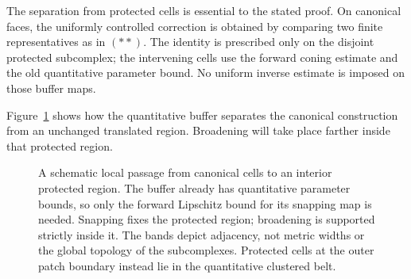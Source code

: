 The separation from protected cells is essential to the stated
proof.  On canonical faces, the uniformly controlled correction
is obtained by comparing two finite representatives as in $(**)$.
The identity is prescribed only on the disjoint protected
subcomplex; the intervening cells use the forward coning estimate
and the old quantitative parameter bound.  No uniform inverse
estimate is imposed on those buffer maps.

Figure~\ref{ms:fig-protected-buffers} shows how the quantitative buffer
separates the canonical construction from an unchanged translated
region.  Broadening will take place farther inside that protected
region.

\begin{figure}[htbp]
\centering
{}
\caption{A schematic local passage from canonical cells to an interior
protected region.  The buffer already has quantitative parameter bounds,
so only the forward Lipschitz bound for its snapping map is needed.
Snapping fixes the protected region; broadening is supported strictly
inside it.  The bands depict adjacency, not metric widths or the global
topology of the subcomplexes.  Protected cells at the outer patch boundary
instead lie in the quantitative clustered belt.}
\label{ms:fig-protected-buffers}
\end{figure}

